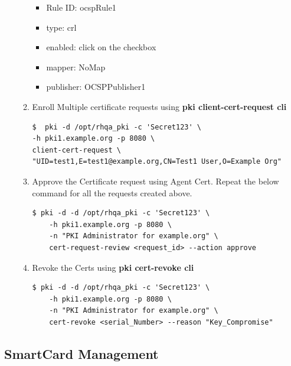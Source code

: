 \documentclass[12pt]{report}
\begin{document}
\begin{enumerate}[label*=\arabic*.]
\begin{enumerate}[label*=\arabic*.]
                    \begin{itemize}
                        \item Rule ID: ocspRule1
                        \item type: crl
                        \item enabled: click on the checkbox
                        \item mapper: NoMap
                        \item publisher: OCSPPublisher1
                    \end{itemize}
                \item Enroll Multiple certificate requests using \textbf{pki client-cert-request cli}
                    \begin{lstlisting}
$  pki -d /opt/rhqa_pki -c 'Secret123' \
-h pki1.example.org -p 8080 \
client-cert-request \
"UID=test1,E=test1@example.org,CN=Test1 User,O=Example Org"
                    \end{lstlisting}
                \item Approve the Certificate request using Agent Cert. Repeat the below command for all the requests created above.
                    \begin{lstlisting}[style=bashInputStyle]
$ pki -d -d /opt/rhqa_pki -c 'Secret123' \
    -h pki1.example.org -p 8080 \
    -n "PKI Administrator for example.org" \
    cert-request-review <request_id> --action approve       
                    \end{lstlisting}
                \item Revoke the Certs using \textbf{pki cert-revoke cli}
                    \begin{lstlisting}[style=bashInputStyle]
$ pki -d -d /opt/rhqa_pki -c 'Secret123' \
    -h pki1.example.org -p 8080 \
    -n "PKI Administrator for example.org" \
    cert-revoke <serial_Number> --reason "Key_Compromise"
                    \end{lstlisting}
             \end{enumerate}
    \end{enumerate}
\subsection{SmartCard Management}
\end{document}
